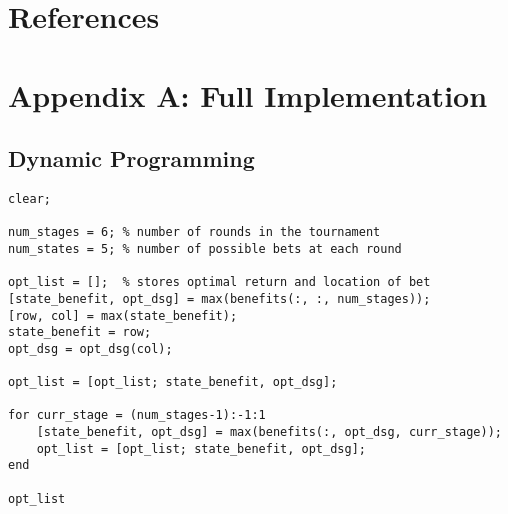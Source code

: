 \documentclass[12pt]{article}
\begin{document}
\newpage
\section{References}



\newpage
\section{Appendix A: Full Implementation}
\subsection{Dynamic Programming}
\begin{verbatim}
clear;

num_stages = 6;	% number of rounds in the tournament
num_states = 5;	% number of possible bets at each round

opt_list = [];	% stores optimal return and location of bet
[state_benefit, opt_dsg] = max(benefits(:, :, num_stages));
[row, col] = max(state_benefit);
state_benefit = row;
opt_dsg = opt_dsg(col);

opt_list = [opt_list; state_benefit, opt_dsg];

for curr_stage = (num_stages-1):-1:1
	[state_benefit, opt_dsg] = max(benefits(:, opt_dsg, curr_stage));
	opt_list = [opt_list; state_benefit, opt_dsg];
end

opt_list
\end{verbatim}
\end{document}
